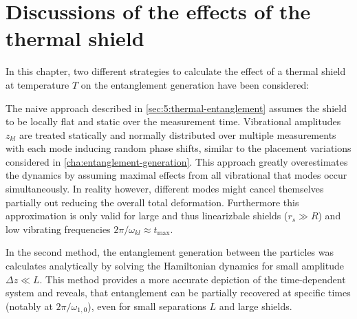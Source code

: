\section{Discussions of the effects of the thermal shield} \label{sec:5:discussion}

In this chapter, two different strategies to calculate the effect of a thermal shield at temperature $T$ on the entanglement generation have been considered:

The naive approach described in \cref{sec:5:thermal-entanglement} assumes the shield to be locally flat and static over the measurement time. Vibrational amplitudes $z_{kl}$ are treated statically and normally distributed over multiple measurements with each mode inducing random phase shifts, similar to the placement variations considered in \cref{cha:entanglement-generation}.
This approach greatly overestimates the dynamics by assuming maximal effects from all vibrational that modes occur simultaneously. In reality however, different modes might cancel themselves partially out reducing the overall total deformation.
Furthermore this approximation is only valid for large and thus linearizbale shields ($r_s \gg R$) and low vibrating frequencies $2\pi/\omega_{kl} \approx t_\mathrm{max}$.

In the second method, the entanglement generation between the particles was calculates analytically by solving the Hamiltonian dynamics for small amplitude $\Delta z \ll L$. This method provides a more accurate depiction of the time-dependent system and reveals, that entanglement can be partially recovered at specific times (notably at $2\pi/\omega_{1,0}$), even for small separations $L$ and large shields.

